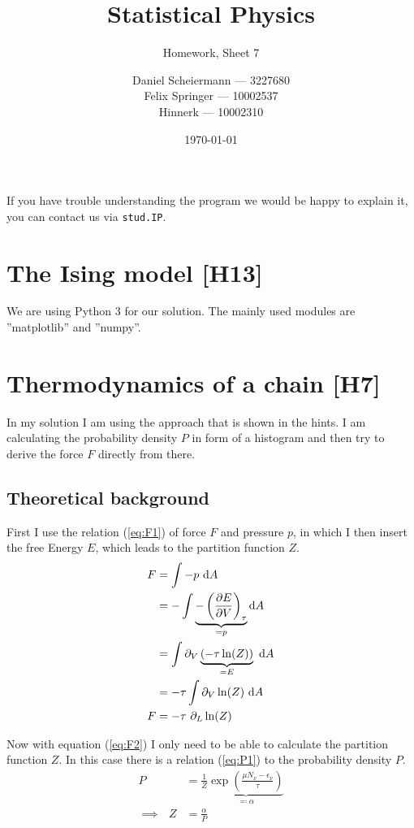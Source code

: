 \documentclass[a4paper,12pt]{scrartcl}
\title{Statistical Physics}
\subtitle{Homework, Sheet 7}
\author{Daniel Scheiermann --- 3227680 \\ Felix Springer --- 10002537 \\ Hinnerk --- 10002310}
\date{\today}
\begin{document}
\maketitle

If you have trouble understanding the program we would be happy to explain it, you can contact us via \texttt{stud.IP}.

\section{The Ising model [H13]}
We are using Python 3 for our solution. The mainly used modules are ''matplotlib'' and ''numpy''.

\section{Thermodynamics of a chain [H7]}
In my solution I am using the approach that is shown in the hints.
I am calculating the probability density $P$ in form of a histogram and then try to derive the force $F$ directly from there.

\subsection{Theoretical background}
First I use the relation (\ref{eq:F1}) of force $F$ and pressure $p$, in which I then insert the free Energy $E$, which leads to the partition function $Z$.
\begin{align}
	F &= \int - p \text{ d}A \label{eq:F1} \\
	&= - \int \underbrace{- \left( \frac{\partial E}{\partial V} \right)_{\tau}}_{= p} \text{d}A \notag \\
	&= \int \partial_V \underbrace{(- \tau \ln(Z))}_{= E} \text{ d}A \notag \\
	&= - \tau \int \partial_V \ln(Z) \text{ d}A \notag \\
	F &= - \tau \text{ } \partial_L \ln(Z) \label{eq:F2}
\end{align}

Now with equation (\ref{eq:F2}) I only need to be able to calculate the partition function $Z$.
In this case there is a relation (\ref{eq:P1}) to the probability density $P$.
\begin{align}
	P &= \frac{1}{Z} \underbrace{\exp \left( {\frac{\mu N_\nu - \epsilon_\nu}{\tau}} \right)}_{\eqqcolon \alpha} \label{eq:P1} \\
	\implies \text{ } Z &= \frac{\alpha}{P} \label{eq:Z1}
\end{align}
\end{document}

